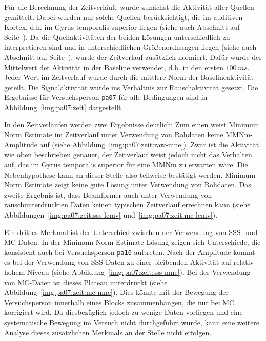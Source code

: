 \documentclass[doc,a4paper,12pt]{apa6}
\makeatletter
\DeclareRobustCommand*{\nameref}[1]{%
      \glqq{\myorg@nameref{#1}}\grqq%
    }%
\makeatother
\begin{document}
Für die Berechnung der Zeitverläufe wurde zunächst die Aktivität aller Quellen gemittelt. Dabei wurden nur solche Quellen berücksichtigt, die im auditiven Kortex, d.h. im Gyrus temporalis superior liegen (siehe auch Abschnitt \nameref{sec:audicort} auf Seite~\pageref{sec:audicort}). Da die Quellaktivitäten der beiden Lösungen unterschiedlich zu interpretieren sind und in unterschiedlichen Größenordnungen liegen (siehe auch Abschnitt \nameref{sec:amplitud} auf Seite~\pageref{sec:amplitud}), wurde der Zeitverlauf zusätzlich normiert. Dafür wurde der Mittelwert der Aktivität in der Baseline verwendet, d.h. in den ersten $100\,ms$. Jeder Wert im Zeitverlauf wurde durch die mittlere Norm der Baselineaktivität geteilt. Die Signalaktivität wurde ins Verhältnis zur Rauschaktivität gesetzt. Die Ergebnisse für Versuchsperson \texttt{pa07} für alle Bedingungen sind in Abbildung~\ref{img:pa07:zeit} dargestellt.

In den Zeitverläufen werden zwei Ergebnisse deutlich: Zum einen weist Minimum Norm Estimate im Zeitverlauf unter Verwendung von Rohdaten keine MMNm-Amplitude auf (siehe Abbildung~\ref{img:pa07:zeit:raw-mne}). Zwar ist die Aktivität wie oben beschrieben genauer, der Zeitverlauf weist jedoch nicht das Verhalten auf, das im Gyrus temporalis superior für eine MMNm zu erwarten wäre. Die Nebenhypothese kann an dieser Stelle also teilweise bestätigt werden. Minimum Norm Estimate zeigt keine gute Lösung unter Verwendung von Rohdaten. Das zweite Ergebnis ist, dass Beamformer auch unter Verwendung von rauschunterdrückten Daten keinen typischen Zeitverlauf errechnen kann (siehe Abbildungen~\ref{img:pa07:zeit:sss-lcmv} und~\ref{img:pa07:zeit:mc-lcmv}).

Ein drittes Merkmal ist der Unterschied zwischen der Verwendung von SSS- und MC-Daten. In der Minimum Norm Estimate-Lösung zeigen sich Unterschiede, die konsistent auch bei Versuchsperson \texttt{pa10} auftreten. Nach der Amplitude kommt es bei der Verwendung von SSS-Daten zu einer bleibenden Aktivität auf relativ hohem Niveau (siehe Abbildung~\ref{img:pa07:zeit:sss-mne}). Bei der Verwendung von MC-Daten ist dieses Plateau unterdrückt (siehe Abbildung~\ref{img:pa07:zeit:mc-mne}). Dies könnte mit der Bewegung der Versuchsperson innerhalb eines Blocks zusammenhängen, die nur bei MC korrigiert wird. Da diesbezüglich jedoch zu wenige Daten vorliegen und eine systematische Bewegung im Versuch nicht durchgeführt wurde, kann eine weitere Analyse dieses zusätzlichen Merkmals an der Stelle nicht erfolgen.

\end{document}
